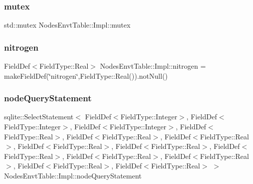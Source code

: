 \subsubsection{\texorpdfstring{mutex}{mutex}}
{\footnotesize\ttfamily std\+::mutex Nodes\+Envt\+Table\+::\+Impl\+::mutex}

\mbox{\label{struct_nodes_envt_table_1_1_impl_a04c7f1f3df57bcc628942d0e223f001c}} 
\subsubsection{\texorpdfstring{nitrogen}{nitrogen}}
{\footnotesize\ttfamily Field\+Def$<$Field\+Type\+::\+Real$>$ Nodes\+Envt\+Table\+::\+Impl\+::nitrogen = make\+Field\+Def(\char`\"{}nitrogen\char`\"{},Field\+Type\+::\+Real()).not\+Null()}

\mbox{\label{struct_nodes_envt_table_1_1_impl_a00f2de6a6a3726878211866fccf3fb37}} 
\subsubsection{\texorpdfstring{nodeQueryStatement}{nodeQueryStatement}}
{\footnotesize\ttfamily sqlite\+::\+Select\+Statement$<$ Field\+Def$<$Field\+Type\+::\+Integer$>$, Field\+Def$<$Field\+Type\+::\+Integer$>$, Field\+Def$<$Field\+Type\+::\+Integer$>$, Field\+Def$<$Field\+Type\+::\+Real$>$, Field\+Def$<$Field\+Type\+::\+Real$>$, Field\+Def$<$Field\+Type\+::\+Real$>$, Field\+Def$<$Field\+Type\+::\+Real$>$, Field\+Def$<$Field\+Type\+::\+Real$>$, Field\+Def$<$Field\+Type\+::\+Real$>$, Field\+Def$<$Field\+Type\+::\+Real$>$, Field\+Def$<$Field\+Type\+::\+Real$>$, Field\+Def$<$Field\+Type\+::\+Real$>$, Field\+Def$<$Field\+Type\+::\+Real$>$ $>$ Nodes\+Envt\+Table\+::\+Impl\+::node\+Query\+Statement}

\mbox{\label{struct_nodes_envt_table_1_1_impl_add273fa2bf6f66d08fb43542c19b37f0}} 
